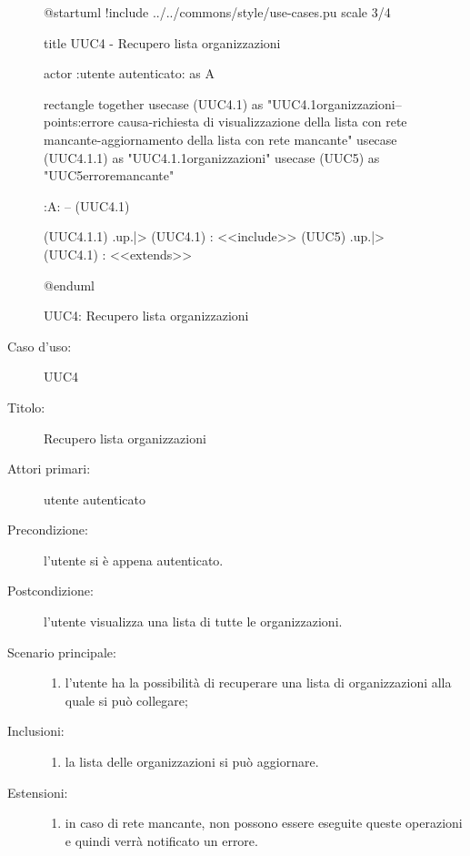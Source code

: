 \documentclass[casi-duso]{subfiles}
\begin{document}
\begin{figure}[h!] 
  \centering 
  \begin{plantuml}
  @startuml
  !include ../../commons/style/use-cases.pu
  scale 3/4

  title UUC4 - Recupero lista organizzazioni

  actor :utente autenticato: as A

  rectangle {
    together {
      usecase (UUC4.1) as "UUC4.1\nVisualizzazione\nlista organizzazioni\n--\nExtension points:\nVisualizzazione errore causa\n-richiesta di visualizzazione della lista con rete mancante\n-aggiornamento della lista con rete mancante"
      usecase (UUC4.1.1) as "UUC4.1.1\nAggiornamento\nlista organizzazioni"
      usecase (UUC5) as "UUC5\nVisualizzazione errore\nrete mancante"
    }
  }

  :A: -- (UUC4.1)

  (UUC4.1.1) .up.|> (UUC4.1) : <<include>>
  (UUC5) .up.|> (UUC4.1) : <<extends>>

  @enduml
  \end{plantuml} 
  \caption{UUC4: Recupero lista organizzazioni} 
  \label{fig:uuc4} 
\end{figure}

\begin{description}
  \item[Caso d’uso:] UUC4
  \item[Titolo:] Recupero lista organizzazioni
  \item[Attori primari:] utente autenticato
  \item[Precondizione:] l'utente si è appena autenticato.
  \item[Postcondizione:] l'utente visualizza una lista di tutte le organizzazioni.
  \item[Scenario principale:]
        \begin{enumerate}
          \item l'utente ha la possibilità di recuperare una lista di organizzazioni alla quale si può collegare;
        \end{enumerate}
  \item[Inclusioni:]
        \begin{enumerate}
          \item la lista delle organizzazioni si può aggiornare.
        \end{enumerate}
  \item[Estensioni:]
        \begin{enumerate}
          \item in caso di rete mancante, non possono essere eseguite queste operazioni e quindi verrà notificato un errore.
        \end{enumerate}
\end{description}
\end{document}
